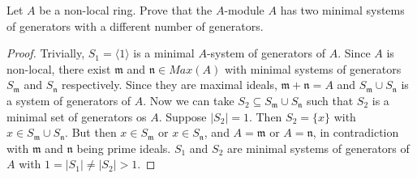 \begin{problem}
    Let $A$ be a non-local ring.
    Prove that the $A$-module $A$ has two minimal systems of generators with a different number of generators.
    \begin{sol}
        \begin{proof}
            Trivially, $S_1 = \langle1\rangle$ is a minimal $A$-system of generators of $A$.
            Since $A$ is non-local, there exist $\mathfrak{m}$ and $\mathfrak{n} \in Max(A)$ with minimal systems of
            generators $S_\mathfrak{m}$ and $S_\mathfrak{n}$ respectively.
            Since they are maximal ideals, $\mathfrak{m} + \mathfrak{n} = A$ and $S_\mathfrak{m} \cup S_\mathfrak{n}$ is a
            system of generators of $A$.
            Now we can take $S_2 \subseteq S_\mathfrak{m} \cup S_\mathfrak{n}$ such that $S_2$ is a minimal set of
            generators os $A$.
            Suppose $|S_2| = 1$.
            Then $S_2 = \{x\}$ with $x \in S_\mathfrak{m} \cup S_\mathfrak{n}$.
            But then $x \in S_\mathfrak{m}$ or $x \in S_\mathfrak{n}$, and $A = \mathfrak{m}$ or $A = \mathfrak{n}$, in
            contradiction with $\mathfrak{m}$ and $\mathfrak{n}$ being prime ideals.
            $S_1$ and $S_2$ are minimal systems of generators of $A$ with $1 = |S_1| \neq |S_2| > 1$.
        \end{proof}
    \end{sol}
\end{problem}